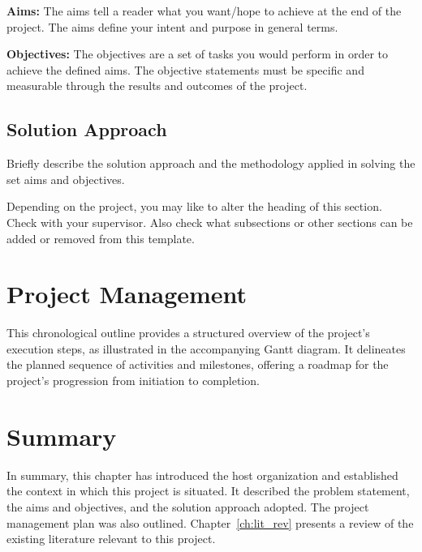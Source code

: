 \textbf{Aims:} The aims tell a reader what you want/hope to achieve at the end 
of the project. The aims define your intent and purpose in general terms.

\textbf{Objectives:} The objectives are a set of tasks you would perform in order 
to achieve the defined aims. The objective statements must be specific and 
measurable through the results and outcomes of the project.

\subsection{Solution Approach}
\label{sec:intro_sol}
Briefly describe the solution approach and the methodology applied in solving 
the set aims and objectives.

Depending on the project, you may like to alter the heading of this section. 
Check with your supervisor. Also check what subsections or other sections can 
be added or removed from this template.

\section{Project Management}
\label{sec:proj_mgmt}

This chronological outline provides a structured overview of the project's 
execution steps, as illustrated in the accompanying Gantt diagram. It delineates 
the planned sequence of activities and milestones, offering a roadmap for the 
project's progression from initiation to completion.

\section{Summary} %
\label{sec:intro_summary} %

In summary, this chapter has introduced the host organization and established 
the context in which this project is situated. It described the problem statement, 
the aims and objectives, and the solution approach adopted. The project management 
plan was also outlined. Chapter~\ref{ch:lit_rev} presents a review of the 
existing literature relevant to this project.